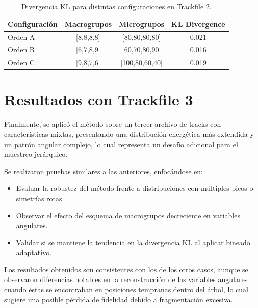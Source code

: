 \begin{table}[H]
    \centering
    \caption{Divergencia KL para distintas configuraciones en Trackfile 2.}
    \begin{tabular}{lccc}
        \toprule
        \textbf{Configuración} & \textbf{Macrogrupos} & \textbf{Microgrupos} & \textbf{KL Divergence} \\
        \midrule
        Orden A & [8,8,8,8] & [80,80,80,80] & 0.021 \\
        Orden B & [6,7,8,9] & [60,70,80,90] & 0.016 \\
        Orden C & [9,8,7,6] & [100,80,60,40] & 0.019 \\
        \bottomrule
    \end{tabular}
    \label{tab:trackfile2_kl}
\end{table}


\section{Resultados con Trackfile 3}
\label{sec:resultados-track3}

Finalmente, se aplicó el método sobre un tercer archivo de tracks con características mixtas, presentando una distribución energética más extendida y un patrón angular complejo, lo cual representa un desafío adicional para el muestreo jerárquico.

Se realizaron pruebas similares a las anteriores, enfocándose en:

\begin{itemize}
    \item Evaluar la robustez del método frente a distribuciones con múltiples picos o simetrías rotas.
    \item Observar el efecto del esquema de macrogrupos decreciente en variables angulares.
    \item Validar si se mantiene la tendencia en la divergencia KL al aplicar bineado adaptativo.
\end{itemize}

Los resultados obtenidos son consistentes con los de los otros casos, aunque se observaron diferencias notables en la reconstrucción de las variables angulares cuando éstas se encontraban en posiciones tempranas dentro del árbol, lo cual sugiere una posible pérdida de fidelidad debido a fragmentación excesiva.


